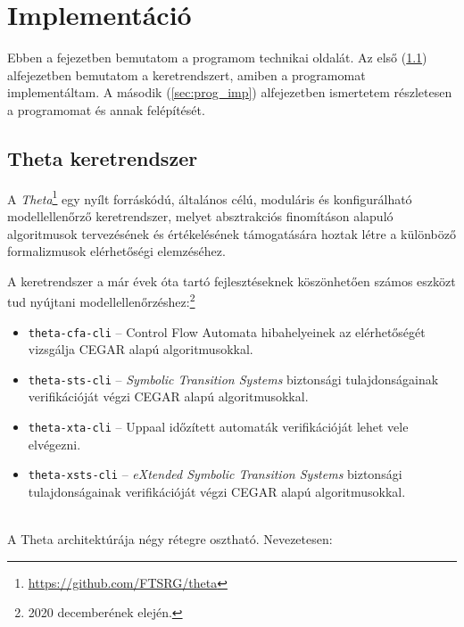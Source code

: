 \chapter{Implementáció}

Ebben a fejezetben bemutatom a programom technikai oldalát. Az első (\ref{sec:theta_keretrendszer}) alfejezetben bemutatom a keretrendszert, amiben a programomat implementáltam. A második (\ref{sec:prog_imp}) alfejezetben ismertetem részletesen a programomat és annak felépítését.

\section{Theta keretrendszer}
\label{sec:theta_keretrendszer}

A \emph{Theta}\footnote{\url{https://github.com/FTSRG/theta}} egy nyílt forráskódú, általános célú, moduláris és konfigurálható modellellenőrző keretrendszer, melyet absztrakciós finomításon alapuló algoritmusok tervezésének és értékelésének támogatására hoztak létre a különböző formalizmusok elérhetőségi elemzéséhez.

A keretrendszer a már évek óta tartó fejlesztéseknek köszönhetően számos eszközt tud nyújtani modellellenőrzéshez:\footnote{2020 decemberének elején.}

\begin{itemize}
	\item \verb+theta-cfa-cli+ -- Control Flow Automata hibahelyeinek az elérhetőségét vizsgálja CEGAR alapú algoritmusokkal.
	
	\item \verb+theta-sts-cli+ -- \emph{Symbolic Transition Systems} biztonsági tulajdonságainak verifikációját végzi CEGAR alapú algoritmusokkal.
	
	\item \verb+theta-xta-cli+ -- Uppaal időzített automaták verifikációját lehet vele elvégezni.
	
	\item \verb+theta-xsts-cli+ -- \emph{eXtended Symbolic Transition Systems} biztonsági tulajdonságainak verifikációját végzi CEGAR alapú algoritmusokkal.
\end{itemize}
\ \\
A Theta architektúrája négy rétegre osztható. Nevezetesen:

